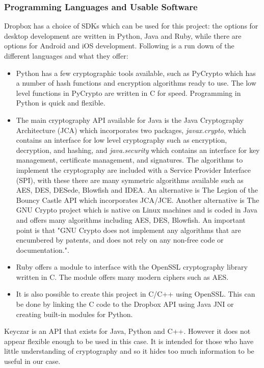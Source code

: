 \documentclass[10pt, titlepage]{article}
\begin{document}
\subsubsection{Programming Languages and Usable Software}
Dropbox has a choice of SDKs which can be used for this project: the options for desktop development are written in Python, Java and Ruby, while there are options for Android and iOS development.
\newline Following is a run down of the different languages and what they offer:
\begin{itemize}
\item Python has a few cryptographic tools available, such as PyCrypto which has a number of hash functions and encryption algorithms ready to use. The low level functions in PyCrypto are written in C for speed.\cite{pyCrypto} Programming in Python is quick and flexible.
\item The main cryptography API available for Java is the Java Cryptography Architecture (JCA) which incorporates two packages, \textit{javax.crypto}, which contains an interface for low level cryptography such as encryption, decryption, and hashing, and \textit{java.security} which contains an interface for key management, certificate management, and signatures. The algorithms to implement the cryptography are included with a Service Provider Interface (SPI), with these there are many symmetric algorithms available such as AES, DES, DESede, Blowfish and IDEA\cite{javaJCA}. An alternative is The Legion of the Bouncy Castle API which incorporates JCA/JCE\cite{bouncyCastle}. Another alternative is The GNU Crypto project which is native on Linux machines and is coded in Java and offers many algorithms including AES, DES, Blowfish. An important point is that "GNU Crypto does not implement any algorithms that are encumbered by patents, and does not rely on any non-free code or documentation."\cite{gnuCrypto}.
\item Ruby offers a module to interface with the OpenSSL cryptography library written in C. The module offers many modern ciphers such as AES.\cite{rubyOpenSSL}
\item It is also possible to create this project in C/C++ using OpenSSL. This can be done by linking the C code to the Dropbox API using Java JNI or creating built-in modules for Python.
\end{itemize}
Keyczar is an API that exists for Java, Python and C++.\cite{keyczar} However it does not appear flexible enough to be used in this case. It is intended for those who have little understanding of cryptography and so it hides too much information to be useful in our case.
\end{document}
